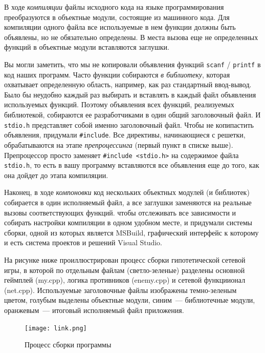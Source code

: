 \documentclass{article}
\begin{document}
В ходе \emph{компиляции} файлы исходного кода на языке программирования преобразуются в объектные модули, состоящие из машинного кода. Для компиляции одного файла все используемые в нем функции должны быть объявлены, но не обязательно определены. В места вызова еще не определенных функций в объектные модули вставляются заглушки. 

Вы могли заметить, что мы не копировали объявления функций \texttt{scanf} / \texttt{printf} в код наших программ.  Часто функции собираются \emph{в библиотеку}, которая охватывает определенную область, например, как раз стандартный ввод-вывод. Было бы неудобно каждый раз выбирать и вставлять в каждый файл объявления используемых функций. Поэтому объявления всех функций, реализуемых библиотекой, собираются ее разработчиками в один общий заголовочный файл. И \texttt{stdio.h} представляет собой именно заголовочный файл. Чтобы не копипастить объявления, придумали \texttt{\#include}. Все директивы, начинающиеся с решетки, обрабатываются на этапе \emph{препроцессинга} (первый пункт в списке выше). Препроцессор просто заменяет \texttt{\#include <stdio.h>} на содержимое файла \texttt{stdio.h}, то есть в вашу программу вставляются все объявления еще до того, как она дойдет до этапа компиляции. 

Наконец, в ходе \emph{компоновки} код нескольких объектных модулей (и библиотек) собирается в один исполняемый файл, а все заглушки заменяются на реальные вызовы соответствующих функций. чтобы отслеживать все зависимости и собирать настройки компиляции в одном удобном месте, и придумали системы сборки, одной из которых является MSBuild, графический интерфейс к которому и есть система проектов и решений Visual Studio.

На рисунке ниже проиллюстрирован процесс сборки гипотетической сетевой игры, в которой по отдельным файлам (светло-зеленые) разделены основной геймплей (my.cpp), логика противников (enemy.cpp) и сетевой функциионал (net.cpp). Используемые заголовочные файлы изображены темно-зеленым цветом, голубым выделены объектные модули, синим~--- библиотечные модули, оранжевым~--- итоговый исполняемый файл приложения. 





\begin{figure}
\texttt{[image: link.png]}
\caption{Процесс сборки программы}
\end{figure}
\end{document}
